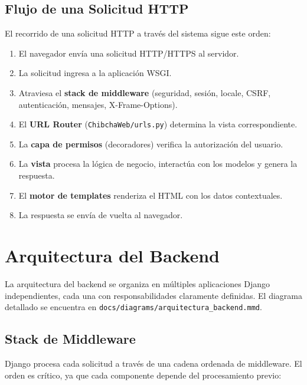 \documentclass[12pt, a4paper]{article}
\begin{document}
\subsection{Flujo de una Solicitud HTTP}

El recorrido de una solicitud HTTP a través del sistema sigue este orden:

\begin{enumerate}
    \item El navegador envía una solicitud HTTP/HTTPS al servidor.
    \item La solicitud ingresa a la aplicación WSGI.
    \item Atraviesa el \textbf{stack de middleware} (seguridad, sesión, locale, CSRF, autenticación, mensajes, X-Frame-Options).
    \item El \textbf{URL Router} (\texttt{ChibchaWeb/urls.py}) determina la vista correspondiente.
    \item La \textbf{capa de permisos} (decoradores) verifica la autorización del usuario.
    \item La \textbf{vista} procesa la lógica de negocio, interactúa con los modelos y genera la respuesta.
    \item El \textbf{motor de templates} renderiza el HTML con los datos contextuales.
    \item La respuesta se envía de vuelta al navegador.
\end{enumerate}

\section{Arquitectura del Backend}
\label{sec:arq-backend}

La arquitectura del backend se organiza en múltiples aplicaciones Django independientes, cada una con responsabilidades claramente definidas. El diagrama detallado se encuentra en \texttt{docs/diagrams/arquitectura\_backend.mmd}.

\subsection{Stack de Middleware}

Django procesa cada solicitud a través de una cadena ordenada de middleware. El orden es crítico, ya que cada componente depende del procesamiento previo:
\end{document}

